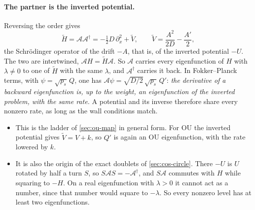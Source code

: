 \documentclass[11pt]{article}
\numberwithin{equation}{section}
\begin{document}
\paragraph{The partner is the inverted potential.} Reversing the order gives
\begin{equation}
  \tilde H=\mathcal A\mathcal A^\dagger=-\tfrac12D\,\partial_x^2+\tilde V,\qquad
  \tilde V=\frac{A^2}{2D}-\frac{A'}{2},
  \label{eq:partner}
\end{equation}
the Schr\"odinger operator of the drift $-A$, that is, of the inverted potential $-U$. The two are intertwined,
$\mathcal AH=\tilde H\mathcal A$. So $\mathcal A$ carries every eigenfunction of $H$ with $\lambda\neq0$ to one of
$\tilde H$ with the same $\lambda$, and $\mathcal A^\dagger$ carries it back. In Fokker--Planck terms, with
$\psi=\sqrt{p_s}\,Q$, one has $\mathcal A\psi=\sqrt{D/2}\,\sqrt{p_s}\,Q'$: \emph{the derivative of a backward
eigenfunction is, up to the weight, an eigenfunction of the inverted problem, with the same rate.} A potential
and its inverse therefore share every nonzero rate, as long as the wall conditions match.
\begin{itemize}
  \item This is the ladder of \cref{sec:ou-map} in general form. For OU the inverted potential gives
        $\tilde V=V+k$, so $Q'$ is again an OU eigenfunction, with the rate lowered by $k$.
  \item It is also the origin of the exact doublets of \cref{sec:cos-circle}. There $-U$ is $U$ rotated by half
        a turn $S$, so $S\mathcal AS=-\mathcal A^\dagger$, and $S\mathcal A$ commutes with $H$ while squaring to
        $-H$. On a real eigenfunction with $\lambda>0$ it cannot act as a number, since that number would square
        to $-\lambda$. So every nonzero level has at least two eigenfunctions.
\end{itemize}
\end{document}
